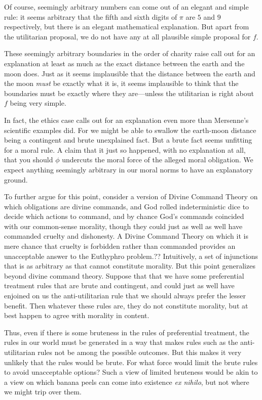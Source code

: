 Of course, seemingly arbitrary numbers can come out of an elegant and simple rule: it seems arbitrary that the fifth and sixth 
digits of $\pi$ are $5$ and $9$ respectively, but there is an elegant mathematical explanation. But apart from the
utilitarian proposal, we do not have any at all plausible simple proposal for $f$.

These seemingly arbitrary boundaries in the order of charity raise call out for an explanation at least as much as 
the exact distance between the earth and the moon does. Just as it seems implausible that the distance between the earth
and the moon \textit{must} be exactly what it is, it seems implausible to think that the boundaries must be exactly where
they are---unless the utilitarian is right about $f$ being very simple. 

In fact, the ethics case calls out for an explanation even more than Mersenne's scientific examples did. For we might 
be able to swallow the earth-moon distance being a contingent and brute unexplained fact. But a brute fact seems unfitting for a moral
rule. A claim that it just so happened, with no explanation at all, that you should $\phi$ undercuts the moral force
of the alleged moral obligation. We expect anything seemingly arbitrary in our moral norms to have an explanatory ground.

To further argue for this point, consider a version of Divine Command Theory on which obligations are divine commands, and
God rolled indeterministic
dice to decide which actions to command, and by chance God's commands coincided with our common-sense morality, though they
could just as well as well have commanded cruelty and dishonesty. A Divine Command Theory on which it is mere chance
that cruelty is forbidden rather than commanded provides an unacceptable answer to the Euthyphro problem.??
Intuitively, a set of injunctions that is as arbitrary as that cannot constitute morality. But this point generalizes beyond
divine command theory. Suppose that that we have some preferential treatment rules that are brute and contingent, and could
just as well have enjoined on us the anti-utilitarian rule that we should always prefer the lesser benefit. Then whatever
these rules are, they do not constitute morality, but at best happen to agree with morality in content. 

Thus, even if there is some bruteness in the rules of preferential treatment, the rules in our world must be generated in a way
that makes rules such as the anti-utilitarian rules not be among the possible outcomes. But this makes it very unlikely that
the rules would be brute. For what force would limit the brute rules to avoid unacceptable options? Such a view of limited
bruteness would be akin to a view on which banana peels can come into existence \textit{ex nihilo}, but not where we might trip
over them.


